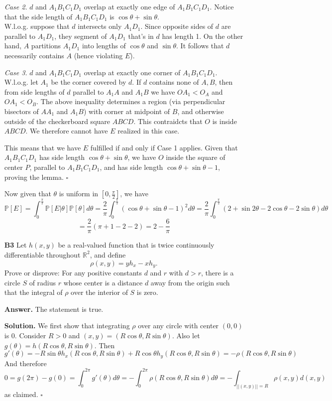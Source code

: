\documentclass[11pt,a4paper]{article}
\newcommand{\bbP}{\mathbb P}
\newcommand{\norm}[1]{||#1||}
\newcommand{\<}{\langle}
\renewcommand{\>}{\rangle}
\begin{document}
\begin{enumerate}
	\emph{Case 2.} $d$ and $A_1B_1C_1D_1$ overlap at exactly one edge of $A_1B_1C_1D_1$. Notice that the side length of $A_1B_1C_1D_1$ is $\cos\theta+\sin\theta$. \\
	W.l.o.g. suppose that $d$ intersects only $A_1D_1$. Since opposite sides of $d$ are parallel to $A_1D_1$, 
	they segment of $A_1D_1$ that's in $d$ has length 1. 
	On the other hand, $A$ partitions $A_1D_1$ into lengths of $\cos\theta$ and $\sin\theta$. 
	It follows that $d$ necessarily contains $A$ (hence violating $E$). 
	
	\emph{Case 3.} $d$ and $A_1B_1C_1D_1$ overlap at exactly one corner of $A_1B_1C_1D_1$. \\
	W.l.o.g. let $A_1$ be the corner covered by $d$. 
	If $d$ contains none of $A, B$, then from side lengths of $d$ parallel to $A_1A$ and $A_1B$ we have 
	$OA_1<O_A$ and $OA_1<O_B$. 
	The above inequality determines a region (via perpendicular bisectors of $AA_1$ and $A_1B$) 
	with corner at midpoint of $B$, and otherwise outside of the checkerboard square $ABCD$. 
	This contraidcts that $O$ is inside $ABCD$. 
	We therefore cannot have $E$ realized in this case. 
	
	This means that we have $E$ fulfilled if and only if Case 1 applies. 
	Given that $A_1B_1C_1D_1$ has side length $\cos\theta+\sin\theta$, we have $O$ inside the square of center $P$, parallel to $A_1B_1C_1D_1$, 
	and has side length $\cos\theta+\sin\theta-1$, proving the lemma. $\square$ 
	
	Now given that $\theta$ is uniform in $[0, \frac{\pi}{2}]$, we have 
	\[
	\bbP[E]
	=\int_{0}^{\frac{\pi}{2}} \bbP[E|\theta]\bbP[\theta]d\theta
	=\frac{2}{\pi} \int_{0}^{\frac{\pi}{2}}(\cos\theta + \sin\theta - 1)^2d\theta
	=\frac{2}{\pi} \int_{0}^{\frac{\pi}{2}}(2+\sin2\theta - 2\cos\theta - 2\sin\theta)d\theta
	\]
	\[
	=\frac{2}{\pi}(\pi + 1 - 2 - 2)
	=2-\frac{6}{\pi}
	\]
	
	\item [\textbf{B3}] 
	Let $h(x,y)$ be a real-valued function that is twice continuously differentiable throughout $\mathbb{R}^2$, and define
	\[
	\rho (x,y)=yh_x -xh_y .
	\]Prove or disprove: For any positive constants $d$ and $r$ with $d>r$, there is a circle $S$ of radius $r$ whose center is a distance $d$ away from the origin such that the integral of $\rho$ over the interior of $S$ is zero.
	
	\textbf{Answer.} The statement is true. 
	
	\textbf{Solution.} 
	We first show that integrating $\rho$ over any circle with center $(0, 0)$ is 0. 
	Consider $R>0$ and $(x, y)=(R\cos\theta, R\sin\theta)$. 
	Also let $g(\theta)=h(R\cos\theta, R\sin\theta)$. 
	Then 
	\[g'(\theta)=-R\sin\theta h_x(R\cos\theta, R\sin\theta)+R\cos\theta h_y(R\cos\theta, R\sin\theta)
	=-\rho(R\cos\theta, R\sin\theta)
	\]
	And therefore 
	\[
	0 = g(2\pi)-g(0)=\int_0^{2\pi}g'(\theta)d\theta
	=-\int_0^{2\pi}\rho(R\cos\theta, R\sin\theta)d\theta
	=-\int_{\norm{(x, y)}=R}\rho(x, y)d(x, y)
	\]
	as claimed. $\square$
	

\end{enumerate}
\end{document}
